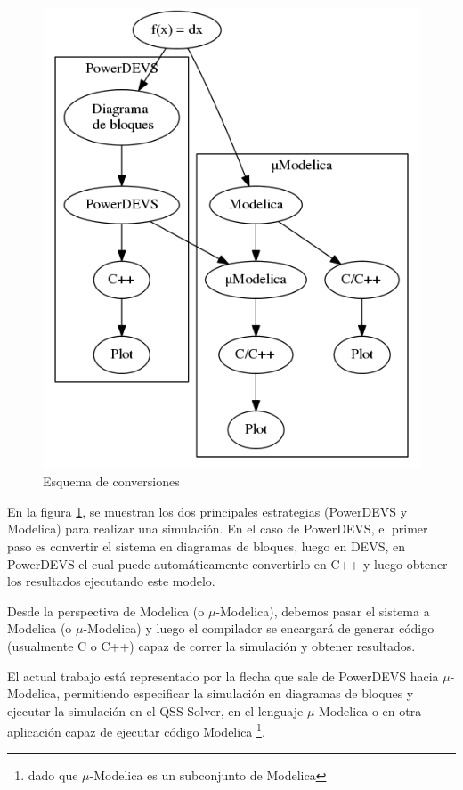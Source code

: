 \begin{figure}[H]
\centering
 \includegraphics[width=0.75\linewidth]{esquema}
 \caption{Esquema de conversiones}
 \label{fig:esquema}
\end{figure}

En la figura \ref{fig:esquema}, se muestran los dos principales estrategias (PowerDEVS\cite{BK11} y Modelica\cite{Fri98}) para realizar una simulación. En el caso de PowerDEVS, el primer paso es convertir el sistema en diagramas de bloques, luego en DEVS\cite{Zeigler}, en PowerDEVS el cual puede automáticamente convertirlo en C++ y luego obtener los resultados ejecutando este modelo. 

Desde la perspectiva de Modelica (o $\mu$-Modelica), debemos pasar el sistema a Modelica (o $\mu$-Modelica) y luego el compilador se encargará de generar código (usualmente C o C++) capaz de correr la simulación y obtener resultados.

El actual trabajo está representado por la flecha que sale de PowerDEVS hacia $\mu$-Modelica, permitiendo especificar la simulación en diagramas de bloques y ejecutar la simulación en el QSS-Solver, en el lenguaje $\mu$-Modelica o en otra aplicación capaz de ejecutar código Modelica \footnote{dado que $\mu$-Modelica es un subconjunto de Modelica}.

